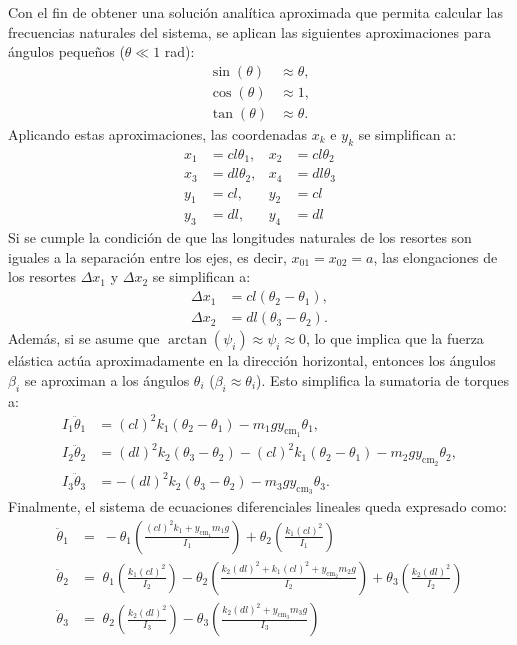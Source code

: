 Con el fin de obtener una soluci\'on anal\'itica aproximada que permita
calcular las frecuencias naturales del sistema, se aplican
las siguientes aproximaciones para \'angulos peque\~nos ($\theta \ll 1$ rad):
\begin{align*}
  \sin(\theta) &\approx \theta, \\
  \cos(\theta) &\approx 1, \\
  \tan(\theta) &\approx \theta.
\end{align*}
Aplicando estas aproximaciones, las coordenadas $x_k$ e $y_k$ se
simplifican a:
\begin{align*}
  x_1 &= c l \theta_1, & x_2 &= c l \theta_2 \\
  x_3 &= d l \theta_2, & x_4 &= d l \theta_3 \\
  y_1 &= c l, & y_2 &= c l \\
  y_3 &= d l, & y_4 &= d l
\end{align*}
Si se cumple la condici\'on de que las longitudes naturales de los
resortes son iguales a la separaci\'on entre los ejes, es decir,
$x_{01} = x_{02} = a$, las elongaciones de los resortes $\Delta x_1$
y $\Delta x_2$ se simplifican a:
\begin{align}
  \Delta x_1 &= cl(\theta_2 - \theta_1) \label{eq:deltax1_approx}, \\
  \Delta x_2 &= dl(\theta_3 - \theta_2) \label{eq:deltax2_approx}.
\end{align}
Adem\'as, si se asume que $\arctan(\psi_i) \approx \psi_i \approx 0$,
lo que implica que la fuerza el\'astica act\'ua aproximadamente en
la direcci\'on horizontal, entonces los \'angulos $\beta_i$ se
aproximan a los \'angulos $\theta_i$ ($\beta_i \approx \theta_i$).
Esto simplifica la sumatoria de torques a:
\begin{align}
  I_1 \ddot{\theta}_1 &= (cl)^2 k_1 (\theta_2 - \theta_1) - m_1 g y_{\text{cm}_1} \theta_1 \label{eq:eq_mov_lin1}, \\
  I_2 \ddot{\theta}_2 &= (dl)^2 k_2 (\theta_3 - \theta_2) - (cl)^2 k_1 (\theta_2 - \theta_1) - m_2 g y_{\text{cm}_2} \theta_2 \label{eq:eq_mov_lin2}, \\
  I_3 \ddot{\theta}_3 &= -(dl)^2 k_2 (\theta_3 - \theta_2) - m_3 g y_{\text{cm}_3} \theta_3 \label{eq:eq_mov_lin3}.
\end{align}
Finalmente, el sistema de ecuaciones diferenciales lineales queda
expresado como:
\begin{align}
  \ddot{\theta}_1 &=\; -\theta_1 \left( \frac{(cl)^2 k_{1} + y_{\text{cm}_1} m_1 g}{I_1} \right) + \theta_2 \left( \frac{k_1 (cl)^2}{I_1} \right) \label{eq:eom1} \\
  \ddot{\theta}_2 &=\; \theta_1 \left( \frac{k_1 (cl)^2}{I_2} \right) - \theta_2 \left( \frac{k_2 (dl)^2 + k_1 (cl)^2 + y_{\text{cm}_2} m_2 g}{I_2} \right) + \theta_3 \left( \frac{k_2 (dl)^2}{I_2} \right) \label{eq:eom2} \\
  \ddot{\theta}_3 &=\; \theta_2 \left( \frac{k_2 (dl)^2}{I_3} \right) - \theta_3 \left( \frac{k_2 (dl)^2 + y_{\text{cm}_3} m_3 g}{I_3} \right) \label{eq:eom3}
\end{align}
